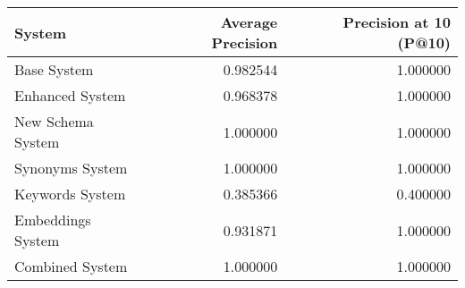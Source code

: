 \begin{tabular}{lrr}
\toprule
System & Average Precision & Precision at 10 (P@10) \\
\midrule
Base System & 0.982544 & 1.000000 \\
Enhanced System & 0.968378 & 1.000000 \\
New Schema System & 1.000000 & 1.000000 \\
Synonyms System & 1.000000 & 1.000000 \\
Keywords System & 0.385366 & 0.400000 \\
Embeddings System & 0.931871 & 1.000000 \\
Combined System & 1.000000 & 1.000000 \\
\bottomrule
\end{tabular}
